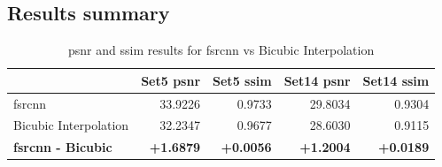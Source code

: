 \subsection{Results summary}
\begin{table}[]
	\centering
	\begin{tabular}{|l|r|r|r|r|}
		\hline
		\rowcolor[HTML]{EFEFEF}
		\multicolumn{1}{|c}{\cellcolor[HTML]{EFEFEF}\textbf{Method}} &
		\multicolumn{1}{c|}{\cellcolor[HTML]{EFEFEF}\textbf{Set5 \gls{psnr}}} & \multicolumn{1}{c|}{\cellcolor[HTML]{EFEFEF}\textbf{Set5 \gls{ssim}}} & \multicolumn{1}{c|}{\cellcolor[HTML]{EFEFEF}\textbf{Set14 \gls{psnr}}} & \multicolumn{1}{c|}{\cellcolor[HTML]{EFEFEF}\textbf{Set14 \gls{ssim}}} \\ \hline
		\rowcolor[HTML]{FFFFFF} 
		\gls{fsrcnn} & 33.9226 & 0.9733 & 29.8034 & 0.9304\\
		\rowcolor[HTML]{EFEFEF} 
		Bicubic Interpolation & 32.2347 & 0.9677 & 28.6030 & 0.9115\\\hline
		\textbf{\gls{fsrcnn} - Bicubic} & \textbf{+1.6879} & \textbf{+0.0056} & \textbf{+1.2004} & \textbf{+0.0189}\\\hline
	\end{tabular}
	\caption{\gls{psnr} and \gls{ssim} results for \gls{fsrcnn} vs Bicubic Interpolation}
	\label{tab:experiment}
\end{table}